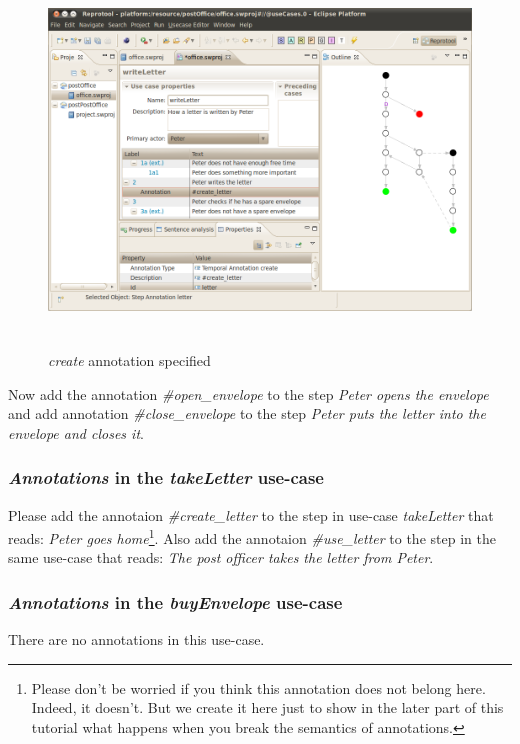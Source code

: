 \newpage

\begin{figure}[ht]
  \centering
  \includegraphics[height=280pt]{images/reprotoolAnnot}
  \caption{\emph{create} annotation specified}
  \label{fig:reprotoolAnnot}
\end{figure}

Now add the annotation \emph{\#open\_envelope} to the step \emph{Peter opens the envelope} and add annotation \emph{\#close\_envelope}
to the step \emph{Peter puts the letter into the envelope and closes it}.

\subsubsection{\emph{Annotations} in the \emph{takeLetter} use-case}
Please add the annotaion \emph{\#create\_letter} to the step in use-case \emph{takeLetter} that reads: \emph{Peter goes home}\footnote{Please don't be worried if you think this annotation does not belong here. Indeed, it doesn't. But we create it
here just to show in the later part of this tutorial what happens when you break the semantics of annotations.}.
Also add the annotaion \emph{\#use\_letter} to the step in the same use-case that reads: \emph{The post officer takes the letter
from Peter}.

\subsubsection{\emph{Annotations} in the \emph{buyEnvelope} use-case}
There are no annotations in this use-case.

